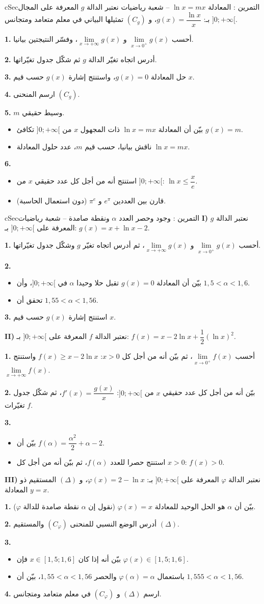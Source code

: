 \documentclass[12pt,a4paper]{article}
\newenvironment{BOX}[2]{\begin{otherlanguage}{english}\begin{arbox}{#1}{#2}}{\end{arbox}\end{otherlanguage}}
\newcounter{exo}
\newenvironment{tamrin}[1]{\stepcounter{exo}\begin{BOX}{cSec}{التمرين \theexo: #1}}{\end{BOX}}
\newenvironment{sq}{\begin{itemize}[leftmargin=2.4em,itemsep=3pt]}{\end{itemize}}
\newcommand{\qa}{\item[(أ)]}\newcommand{\qb}{\item[(ب)]}\newcommand{\qc}{\item[(جـ)]}\newcommand{\qd}{\item[(د)]}\newcommand{\qe}{\item[(هـ)]}
\newcommand{\QQ}[1]{\par\smallskip\textbf{#1.} }
\begin{document}
\begin{tamrin}{المعادلة $\ln x=mx$ -- شعبة رياضيات}
نعتبر الدالة $g$ المعرفة على المجال $]0;+\infty[$ بـ: $g(x)=\dfrac{\ln x}{x}$، و $(C_g)$ تمثيلها البياني في معلم متعامد ومتجانس.
\QQ{1} أحسب $\lim\limits_{x\to 0^{+}}g(x)$ و $\lim\limits_{x\to +\infty}g(x)$، وفسّر النتيجتين بيانيا.
\QQ{2} أدرس اتجاه تغيّر الدالة $g$ ثم شكّل جدول تغيّراتها.
\QQ{3} حل المعادلة $g(x)=0$، واستنتج إشارة $g(x)$ حسب قيم $x$.
\QQ{4} ارسم المنحنى $(C_g)$.
\QQ{5} $m$ وسيط حقيقي.
\begin{sq}
\qa بيّن أن المعادلة $\ln x=mx$ ذات المجهول $x$ من $]0;+\infty[$ تكافئ $g(x)=m$.
\qb ناقش بيانيا، حسب قيم $m$، عدد حلول المعادلة $\ln x=mx$.
\end{sq}
\QQ{6}
\begin{sq}
\qa استنتج أنه من أجل كل عدد حقيقي $x$ من $]0;+\infty[$: $\ln x\leqslant \dfrac{x}{e}$.
\qb قارن بين العددين $e^{\pi}$ و $\pi^{e}$ (دون استعمال الحاسبة).
\end{sq}
\end{tamrin}

\begin{tamrin}{وجود وحصر العدد $\alpha$ ونقطة صامدة -- شعبة رياضيات}
\textbf{I)} نعتبر الدالة $g$ المعرفة على $]0;+\infty[$ بـ: $g(x)=x+\ln x-2$.
\QQ{1} أحسب $\lim\limits_{x\to 0^{+}}g(x)$ و $\lim\limits_{x\to +\infty}g(x)$، ثم أدرس اتجاه تغيّر $g$ وشكّل جدول تغيّراتها.
\QQ{2}
\begin{sq}
\qa بيّن أن المعادلة $g(x)=0$ تقبل حلا وحيدا $\alpha$ في $]0;+\infty[$، وأن $1{,}5<\alpha<1{,}6$.
\qb تحقق أن $1{,}55<\alpha<1{,}56$.
\end{sq}
\QQ{3} استنتج إشارة $g(x)$ حسب قيم $x$.

\textbf{II)} نعتبر الدالة $f$ المعرفة على $]0;+\infty[$ بـ: $f(x)=x-2\ln x+\dfrac{1}{2}(\ln x)^{2}$.
\QQ{1} أحسب $\lim\limits_{x\to 0^{+}}f(x)$، ثم بيّن أنه من أجل كل $x>0$: $f(x)\geqslant x-2\ln x$ واستنتج $\lim\limits_{x\to +\infty}f(x)$.
\QQ{2} بيّن أنه من أجل كل عدد حقيقي $x$ من $]0;+\infty[$: $f'(x)=\dfrac{g(x)}{x}$، ثم شكّل جدول تغيّرات $f$.
\QQ{3}
\begin{sq}
\qa بيّن أن $f(\alpha)=\dfrac{\alpha^{2}}{2}+\alpha-2$.
\qb استنتج حصرا للعدد $f(\alpha)$، ثم بيّن أنه من أجل كل $x>0$: $f(x)>0$.
\end{sq}

\textbf{III)} نعتبر الدالة $\varphi$ المعرفة على $]0;+\infty[$ بـ: $\varphi(x)=2-\ln x$، و $(\Delta)$ المستقيم ذو المعادلة $y=x$.
\QQ{1} بيّن أن $\alpha$ هو الحل الوحيد للمعادلة $\varphi(x)=x$ (نقول إن $\alpha$ نقطة صامدة للدالة $\varphi$).
\QQ{2} أدرس الوضع النسبي للمنحنى $(C_\varphi)$ والمستقيم $(\Delta)$.
\QQ{3}
\begin{sq}
\qa بيّن أنه إذا كان $x\in[1{,}5;1{,}6]$ فإن $\varphi(x)\in[1{,}5;1{,}6]$.
\qb باستعمال $\varphi(\alpha)=\alpha$ والحصر $1{,}55<\alpha<1{,}56$، بيّن أن $1{,}555<\alpha<1{,}56$.
\end{sq}
\QQ{4} ارسم $(\Delta)$ و $(C_\varphi)$ في معلم متعامد ومتجانس.
\end{tamrin}
\end{document}
